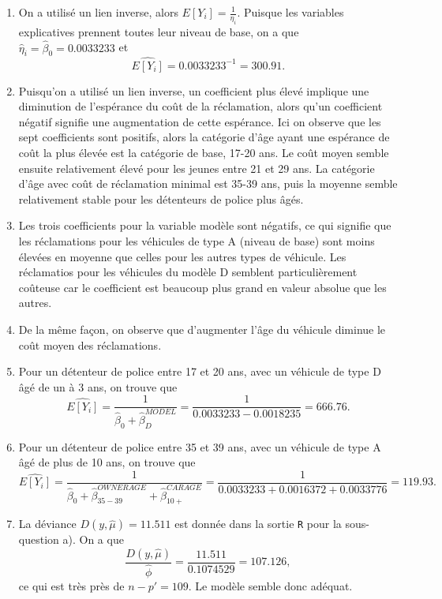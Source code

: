 \begin{solution}{5.8}
\begin{enumerate}
\item On a utilisé un lien inverse, alors $E[Y_i]=\frac{1}{\eta_i}.$ Puisque les variables explicatives prennent toutes leur niveau de base, on a que $\hat{\eta}_i=\hat{\beta}_0=0.0033233$ et $$\widehat{E[Y_i]}=0.0033233^{-1}=300.91.$$

\item Puisqu'on a utilisé un lien inverse, un coefficient plus élevé implique une diminution de l'espérance du coût de la réclamation, alors qu'un coefficient négatif signifie une augmentation de cette espérance. Ici on observe que les sept coefficients sont positifs, alors la catégorie d'âge ayant une espérance de coût la plus élevée est la catégorie de base, 17-20 ans. Le coût moyen semble ensuite relativement élevé pour les jeunes entre 21 et 29 ans. La catégorie d'âge avec coût de réclamation minimal est 35-39 ans, puis la moyenne semble relativement stable pour les détenteurs de police plus âgés.

\item Les trois coefficients pour la variable modèle sont négatifs, ce qui signifie que les réclamations pour les véhicules de type A (niveau de base) sont moins élevées en moyenne que celles pour les autres types de véhicule. Les réclamatios pour les véhicules du modèle D semblent particulièrement coûteuse car le coefficient est beaucoup plus grand en valeur absolue que les autres.

\item De la même façon, on observe que d'augmenter l'âge du véhicule diminue le coût moyen des réclamations.

\item Pour un détenteur de police entre 17 et 20 ans, avec un véhicule de type D âgé de un à 3 ans, on trouve que $$\widehat{E[Y_i]}=\frac{1}{\hat{\beta}_0+\hat{\beta}^{MODEL}_D}=\frac{1}{0.0033233-0.0018235}=666.76.$$

\item Pour un détenteur de police entre 35 et 39 ans, avec un véhicule de type A âgé de plus de 10 ans, on trouve que $$\widehat{E[Y_i]}=\frac{1}{\hat{\beta}_0+\hat{\beta}^{OWNERAGE}_{35-39}+\hat{\beta}^{CARAGE}_{10+}}=\frac{1}{0.0033233+0.0016372+0.0033776}=119.93.$$

\item La déviance $D(y,\hat{\mu})=11.511$ est donnée dans la sortie \texttt{R} pour la sous-question a). On a que $$\frac{D(y,\hat{\mu})}{\hat{\phi}}=\frac{11.511}{0.1074529}=107.126,$$ ce qui est très près de $n-p'=109$. Le modèle semble donc adéquat.


\end{enumerate}
\end{solution}
